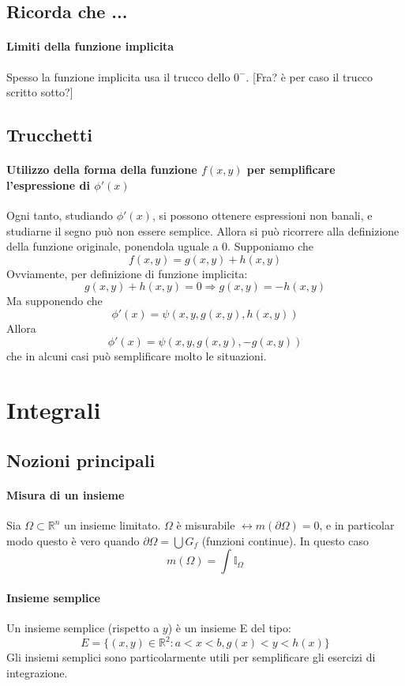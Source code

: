 \documentclass[a4paper,12pt]{book}
\begin{document}
\subsection{Ricorda che ...}
\paragraph{Limiti della funzione implicita}
Spesso la funzione implicita usa il trucco dello $0^-$. [Fra? è per caso il trucco scritto sotto?]

\subsection{Trucchetti}
\paragraph{Utilizzo della forma della funzione $f(x, y)$ per semplificare l'espressione di $\phi'(x)$}
Ogni tanto, studiando $\phi'(x)$, si possono ottenere espressioni non banali, e studiarne il segno può non essere semplice. Allora si può ricorrere alla definizione della funzione originale, ponendola uguale a 0. Supponiamo che
$$ f(x,y) = g(x,y)+h(x,y) $$
Ovviamente, per definizione di funzione implicita:
$$ g(x,y)+h(x,y) = 0 \Rightarrow g(x, y) = -h(x,y)$$
Ma supponendo che
$$ \phi'(x) = \psi(x, y, g(x,y), h(x, y))$$
Allora
$$ \phi'(x) = \psi(x, y, g(x,y), -g(x, y))$$
che in alcuni casi può semplificare molto le situazioni.

\section{Integrali}
\subsection{Nozioni principali}
\paragraph{Misura di un insieme}
Sia $\Omega \subset \mathbb{R}^n$ un insieme limitato. $\Omega$ è misurabile $\leftrightarrow m(\partial\Omega) = 0$, e in particolar modo questo è vero quando $\partial\Omega = \bigcup G_f$ (funzioni continue).
In questo caso
$$m(\Omega) = \int \mathbb{I}_\Omega$$
\paragraph{Insieme semplice}
Un insieme semplice (rispetto a $y$) è un insieme E del tipo:
$$ E = \{(x, y) \in \mathbb{R}^2 : a<x<b, g(x)<y<h(x) \} $$
Gli insiemi semplici sono particolarmente utili per semplificare gli esercizi di integrazione.
\end{document}
